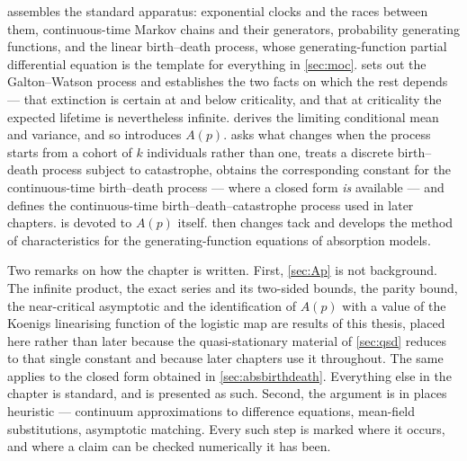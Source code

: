  assembles the standard apparatus: exponential clocks and the
races between them, continuous-time Markov chains and their generators,
probability generating functions, and the linear birth--death process, whose
generating-function partial differential equation is the template for everything in
\cref{sec:moc}.  sets out the Galton--Watson process and establishes
the two facts on which the rest depends --- that extinction is certain at and below
criticality, and that at criticality the expected lifetime is nevertheless infinite.
 derives the limiting conditional mean and variance, and so
introduces $A(p)$.  asks what changes when the process starts from a
cohort of $k$ individuals rather than one, treats a discrete birth--death process
subject to catastrophe, obtains the corresponding constant for the continuous-time
birth--death process --- where a closed form \emph{is} available --- and defines the
continuous-time birth--death--catastrophe process used in later chapters.
 is devoted to $A(p)$ itself.  then changes tack and
develops the method of characteristics for the generating-function equations of
absorption models.

Two remarks on how the chapter is written. First, \cref{sec:Ap} is not background.
The infinite product, the exact series and its two-sided bounds, the parity bound,
the near-critical asymptotic and the identification of $A(p)$ with a value of the
Koenigs linearising function of the logistic map are results of this thesis, placed
here rather than later because the quasi-stationary material of \cref{sec:qsd}
reduces to that single constant and because later chapters use it throughout. The
same applies to the closed form obtained in \cref{sec:absbirthdeath}. Everything
else in the chapter is standard, and is presented as such. Second, the argument is
in places heuristic --- continuum approximations to difference equations,
mean-field substitutions, asymptotic matching. Every such step is marked where it
occurs, and where a claim can be checked numerically it has been.
